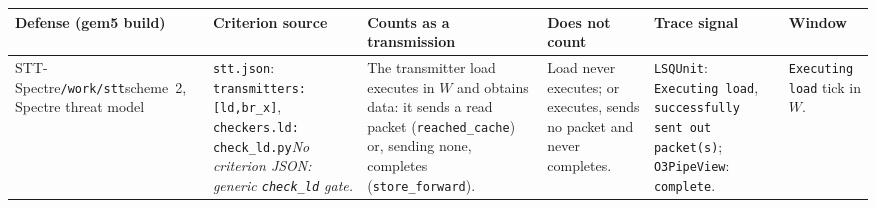 {%
\def\xcwA{67pt}%
\def\xcwB{92pt}%
\def\xcwC{92pt}%
\def\xcwD{80pt}%
\def\xcwE{88pt}%
\def\xcwF{54pt}%
\setlength{\tabcolsep}{2.5pt}%
\def\xcRowGap{3.2pt}%
\scriptsize
\renewcommand{\arraystretch}{1.0}%
\setlength{\aboverulesep}{0pt}\setlength{\belowrulesep}{0pt}%
\def\xs#1{\texttt{#1}}%
\def\xpad{\rule{0pt}{8.2pt}}%
\def\xbot{\rule[-\xcRowGap]{0pt}{0pt}}%
\def\xgray{\cellcolor{black!12}}%
\begin{tabular}{@{}%
  >{\raggedright\arraybackslash}p{\xcwA}%
  >{\raggedright\arraybackslash}p{\xcwB}%
  >{\raggedright\arraybackslash}p{\xcwC}%
  >{\raggedright\arraybackslash}p{\xcwD}%
  >{\raggedright\arraybackslash}p{\xcwE}%
  >{\raggedright\arraybackslash}p{\xcwF}@{}}
\toprule
\xpad Defense (gem5 build) & Criterion source & Counts as a transmission & Does not count & Trace signal & Window\xbot\\
\midrule
\xpad STT-Spectre\newline \xs{/work/stt}\newline scheme~2, Spectre threat model
& \xs{stt.json}: \xs{transmitters:[ld,br\_x]}, \xs{checkers.ld:} \xs{check\_ld.py}\newline \emph{No criterion JSON: generic \xs{check\_ld} gate.}
& The transmitter load executes in $W$ and obtains data: it sends a read packet (\xs{reached\_cache}) or, sending none, completes (\xs{store\_forward}).
& Load never executes; or executes, sends no packet and never completes.
& \xs{LSQUnit}: \xs{Executing load}, \xs{successfully sent out packet(s)}; \xs{O3PipeView}: \xs{complete}.
& \xs{Executing load} tick in $W$.\xbot\\

\end{tabular}}
